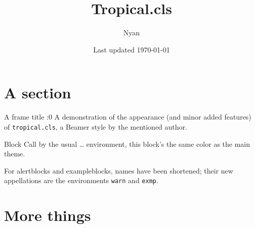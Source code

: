 \documentclass{tropical}
\title{Tropical.cls}
\author{Nyan}
\date{Last updated \today}
\begin{document}
\maketitle{}
\section{A section}
\begin{frame}{A frame title :0}
A demonstration of the appearance (and minor added features) of \texttt{tropical.cls}, a Beamer style by the mentioned author.
\begin{block}{Block}
Call by the usual \dots{} environment, this block's the same color as the main theme.
\end{block}
\begin{warn}[Alertblock]
For alertblocks and exampleblocks, names have been shortened; their new appellations are the environments \texttt{warn} and \texttt{exmp}. 
\end{warn}
\end{frame}
\section{More things}
\end{document}
